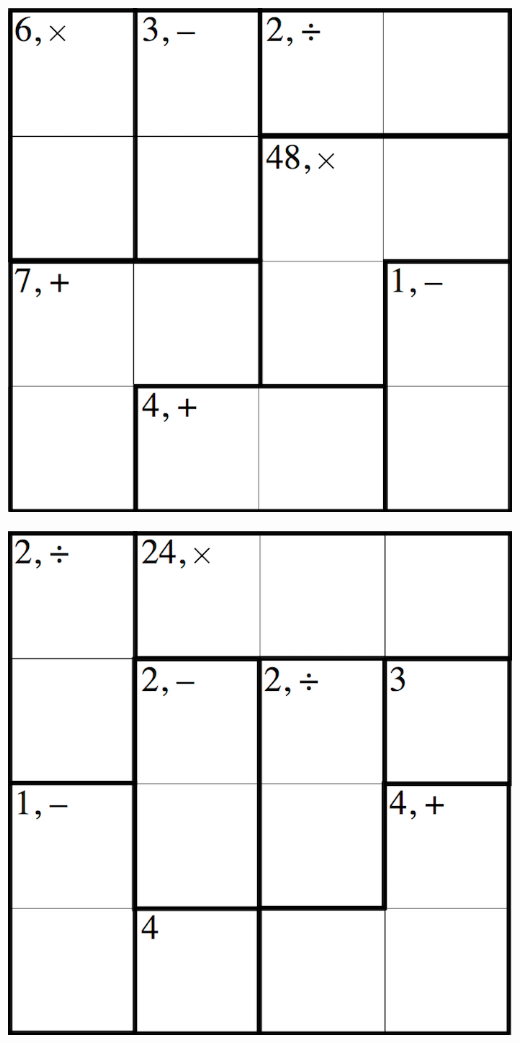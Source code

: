 
\includegraphics[scale=1]{Gambar/Lampiran/4x4_5.png}

\includegraphics[scale=1]{Gambar/Lampiran/4x4_6.png}
